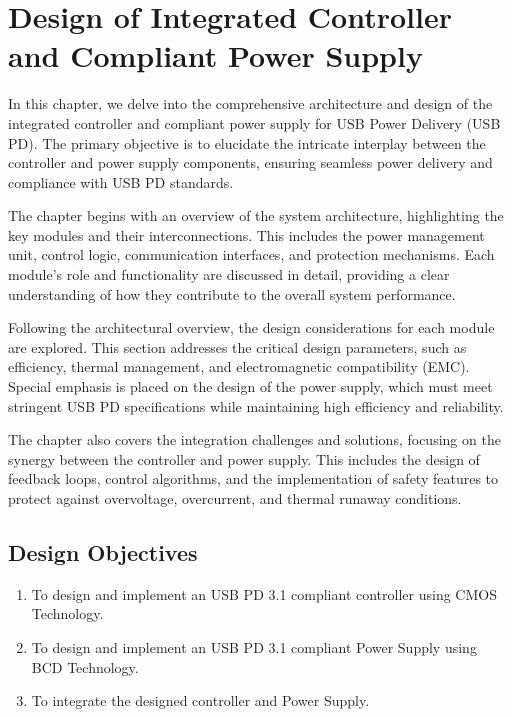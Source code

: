 \chapter{Design of Integrated Controller and Compliant Power Supply}

In this chapter, we delve into the comprehensive architecture and design of the integrated controller and compliant power supply for USB Power Delivery (USB PD). The primary objective is to elucidate the intricate interplay between the controller and power supply components, ensuring seamless power delivery and compliance with USB PD standards.

The chapter begins with an overview of the system architecture, highlighting the key modules and their interconnections. This includes the power management unit, control logic, communication interfaces, and protection mechanisms. Each module’s role and functionality are discussed in detail, providing a clear understanding of how they contribute to the overall system performance.

Following the architectural overview, the design considerations for each module are explored. This section addresses the critical design parameters, such as efficiency, thermal management, and electromagnetic compatibility (EMC). Special emphasis is placed on the design of the power supply, which must meet stringent USB PD specifications while maintaining high efficiency and reliability.

The chapter also covers the integration challenges and solutions, focusing on the synergy between the controller and power supply. This includes the design of feedback loops, control algorithms, and the implementation of safety features to protect against overvoltage, overcurrent, and thermal runaway conditions. 
\section{Design Objectives}

\begin{enumerate}
\item To design and implement an USB PD 3.1 compliant controller using CMOS Technology.
\item To design and implement an USB PD 3.1 compliant Power Supply using BCD
Technology.
\item To integrate the designed controller and Power Supply.

\end{enumerate}


